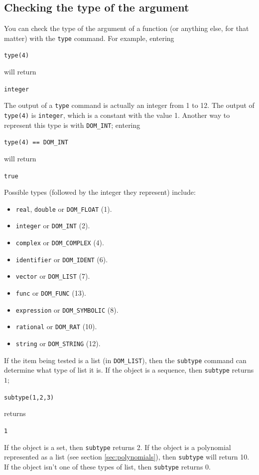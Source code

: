 \documentclass[a4paper,11pt]{book}
\begin{document}
\subsection{Checking the type of the argument}

You can check the type of the argument of a function (or anything
else, for that matter) with the \texttt{type} command.
For example, entering
\begin{center}
{\tt type(4)}
\end{center}
will return
\begin{center}
{\tt integer}
\end{center}

The output of a \texttt{type} command is actually an integer from 1 to
12.  The output of \texttt{type(4)} is \texttt{integer}, which is a
constant with the value 1.  Another way to represent this type is with
\texttt{DOM\_INT}; entering
\begin{center}
{\tt  type(4) == DOM\_INT}
\end{center}
will return
\begin{center}
{\tt  true}
\end{center}
Possible types (followed by the integer they represent) include:
\begin{itemize}
  \item
  \texttt{real}, \texttt{double} or \texttt{DOM\_FLOAT} (1).
  \item
  \texttt{integer} or \texttt{DOM\_INT} (2).
  \item
  \texttt{complex} or \texttt{DOM\_COMPLEX} (4).
  \item
  \texttt{identifier} or \texttt{DOM\_IDENT} (6).
  \item
  \texttt{vector} or \texttt{DOM\_LIST} (7).
  \item
  \texttt{func} or \texttt{DOM\_FUNC} (13).
  \item
  \texttt{expression} or \texttt{DOM\_SYMBOLIC} (8).
  \item
  \texttt{rational} or \texttt{DOM\_RAT} (10).
  \item
  \texttt{string} or \texttt{DOM\_STRING} (12).
\end{itemize}

If the item being tested is a list (in \texttt{DOM\_LIST}), then the
\texttt{subtype} command can determine what type of
list it is.  If the object is a sequence, then \texttt{subtype} returns $1$;
\begin{center}
{\tt  subtype(1,2,3)}
\end{center}
returns
\begin{center}
{\tt  1}
\end{center}
If the object is a set, then \texttt{subtype} returns 2.  If the
object is a polynomial represented as a list (see section
\ref{sec:polynomials}), then \texttt{subtype} will return 10.  If the
object isn't one of these types of list, then \texttt{subtype} returns 0.
\end{document}
